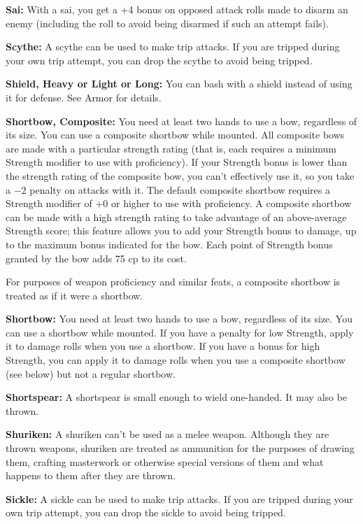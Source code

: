 \textbf{Sai:} With a sai, you get a +4 bonus on opposed attack rolls made to disarm an enemy (including the roll to avoid being disarmed if such an attempt fails). 

\textbf{Scythe:} A scythe can be used to make trip attacks. If you are tripped during your own trip attempt, you can drop the scythe to avoid being tripped. 

\textbf{Shield, Heavy or Light or Long:} You can bash with a shield instead of using it for defense. See Armor for details. 

\textbf{Shortbow, Composite:} You need at least two hands to use a bow, regardless of its size. You can use a composite shortbow while mounted. All composite bows are made with a particular strength rating (that is, each requires a minimum Strength modifier to use with proficiency). If your Strength bonus is lower than the strength rating of the composite bow, you can't effectively use it, so you take a $-2$ penalty on attacks with it. The default composite shortbow requires a Strength modifier of +0 or higher to use with proficiency. A composite shortbow can be made with a high strength rating to take advantage of an above-average Strength score; this feature allows you to add your Strength bonus to damage, up to the maximum bonus indicated for the bow. Each point of Strength bonus granted by the bow adds 75 cp to its cost.

For purposes of weapon proficiency and similar feats, a composite shortbow is treated as if it were a shortbow. 

\textbf{Shortbow:} You need at least two hands to use a bow, regardless of its size. You can use a shortbow while mounted. If you have a penalty for low Strength, apply it to damage rolls when you use a shortbow. If you have a bonus for high Strength, you can apply it to damage rolls when you use a composite shortbow (see below) but not a regular shortbow. 

\textbf{Shortspear:} A shortspear is small enough to wield one-handed. It may also be thrown. 

\textbf{Shuriken:} A shuriken can't be used as a melee weapon. Although they are thrown weapons, shuriken are treated as ammunition for the purposes of drawing them, crafting masterwork or otherwise special versions of them and what happens to them after they are thrown. 

\textbf{Sickle:} A sickle can be used to make trip attacks. If you are tripped during your own trip attempt, you can drop the sickle to avoid being tripped. 

